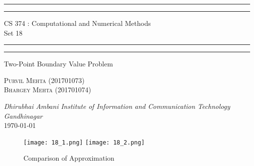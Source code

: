 \documentclass{article}
\begin{document}
\begin{titlepage}
	\centering 
	\scshape
	\vspace*{\baselineskip}
	\rule{\textwidth}{1.6pt}\vspace*{-\baselineskip}\vspace*{2pt}
	\rule{\textwidth}{0.4pt} 
	\vspace{0.75\baselineskip}
	
	{\Large CS 374 : Computational and Numerical Methods \\\vspace{0.75\baselineskip} Set 18}
	\vspace{0.75\baselineskip}
	
	\rule{\textwidth}{0.4pt}\vspace*{-\baselineskip}\vspace{3.2pt} 
	\rule{\textwidth}{1.6pt}
	
	\vspace{2\baselineskip}  
	Two-Point Boundary Value Problem
	
	\vspace*{3\baselineskip}
	
	\vspace{0.5\baselineskip} %
	
	{\scshape\large Purvil Mehta (201701073) \\ Bhargey Mehta (201701074) \\} 
	
	\vspace{1\baselineskip} 
	
	\textit{Dhirubhai Ambani Institute of Information and Communication Technology \\ Gandhinagar\\} 
	\vspace*{2\baselineskip}
	\today


\end{titlepage}
\newpage

\begin{table}[!h]
\end{table}

\begin{figure}
    \centering
    \texttt{[image: 18\_1.png]}
    \texttt{[image: 18\_2.png]}
    \caption{Comparison of Approximation}
\end{figure}
\end{document}
